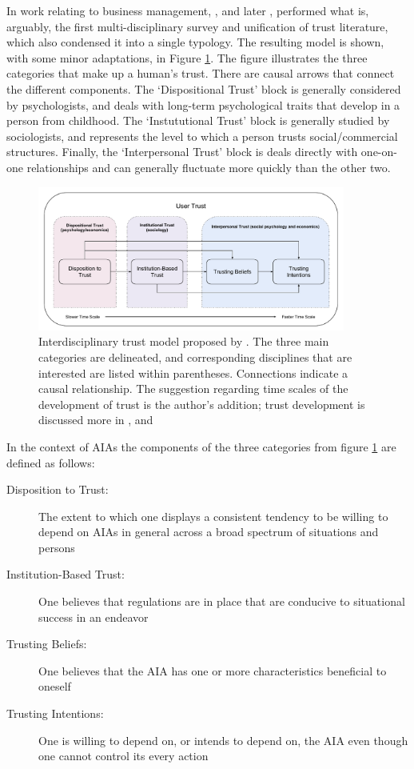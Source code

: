         In work relating to business management, \citet{McKnight1998-ty}, and later \citet{McKnight2001-fa}, performed what is, arguably, the first multi-disciplinary survey and unification of trust literature, which also condensed it into a single typology. The resulting model is shown, with some minor adaptations, in Figure \ref{fig:UserTrust}. The figure illustrates the three categories that make up a human's trust. There are causal arrows that connect the different components. The `Dispositional Trust' block is generally considered by psychologists, and deals with long-term psychological traits that develop in a person from childhood. The `Instututional Trust' block is generally studied by sociologists, and represents the level to which a person trusts social/commercial structures. Finally, the `Interpersonal Trust' block is deals directly with one-on-one relationships and can generally fluctuate more quickly than the other two.

        \begin{figure}[htbp]
            \centering
            \includegraphics[width=0.9\textwidth]{Figures/UserTrust}
            \caption{Interdisciplinary trust model proposed by \citet{McKnight2001-fa}. The three main categories are delineated, and corresponding disciplines that are interested are listed within parentheses. Connections indicate a causal relationship. The suggestion regarding time scales of the development of trust is the author's addition; trust development is discussed more in \cite{Lewicki2006-gp}, and \cite{Lewicki2006-hj}}
            \label{fig:UserTrust}
        \end{figure}

        In the context of AIAs the components of the three categories from figure \ref{fig:UserTrust} are defined as follows:

        \begin{description}
            \item [Disposition to Trust:] The extent to which one displays a consistent tendency to be willing to depend on AIAs in general across a broad spectrum of situations and persons
            \item [Institution-Based Trust:] One believes that regulations are in place that are conducive to situational success in an endeavor
            \item [Trusting Beliefs:] One believes that the AIA has one or more characteristics beneficial to oneself
            \item [Trusting Intentions:] One is willing to depend on, or intends to depend on, the AIA even though one cannot control its every action
        \end{description}

